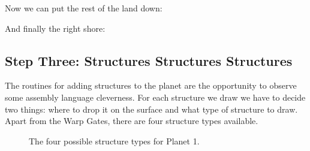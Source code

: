 Now we can put the rest of the land down:

%


And finally the right shore:

%


\subsection{Step Three: Structures Structures Structures}
The routines for adding structures to the planet are the opportunity to observe some assembly language cleverness.
For each structure we draw we have to decide two things: where to drop it on the surface and what type of structure
to draw. Apart from the Warp Gates, there are four structure types available. 

\begin{figure}[H]
  {
    \setlength{\tabcolsep}{3.0pt}
    \setlength\cmidrulewidth{\heavyrulewidth} %
    \begin{adjustbox}{width=15cm,center}
      \begin{subfigure}{0.3\textwidth}
        
      \end{subfigure}
      \begin{subfigure}{0.3\textwidth}
        
      \end{subfigure}
      \begin{subfigure}{0.3\textwidth}
        
      \end{subfigure}
      \begin{subfigure}{0.3\textwidth}
        
      \end{subfigure}
    \end{adjustbox}
  }\caption[]{The four possible structure types for Planet 1.}
\end{figure}

